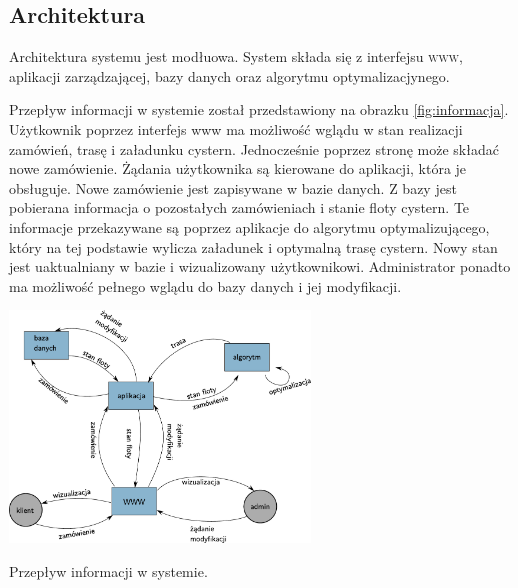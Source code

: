 \documentclass[11pt,a4paper,oneside]{mwart}
\begin{document}
\subsection{Architektura}
Architektura systemu jest modłuowa. System składa się z interfejsu \textsc{www}, aplikacji zarządzającej, bazy danych oraz algorytmu optymalizacjynego.

Przepływ informacji w systemie został przedstawiony na obrazku \ref{fig:informacja}. Użytkownik poprzez interfejs www ma możliwość wglądu w stan realizacji zamówień, trasę i załadunku cystern. Jednocześnie poprzez stronę może składać nowe zamówienie. Żądania użytkownika są kierowane do aplikacji, która je obsługuje. Nowe zamówienie jest zapisywane w bazie danych. Z bazy jest pobierana informacja o pozostałych zamówieniach i stanie floty cystern. Te informacje przekazywane są poprzez aplikacje do algorytmu optymalizującego, który na tej podstawie wylicza załadunek i optymalną trasę cystern.  Nowy stan jest uaktualniany w bazie i wizualizowany użytkownikowi.
Administrator ponadto ma możliwość pełnego wglądu do bazy danych i jej modyfikacji.

\begin{schemat}
  \centering
  \includegraphics[width=0.6\textwidth]{pics/przep_inf.pdf}
  \caption{Przepływ informacji w systemie.}
  \label{fig:informacja}
\end{schemat}

\end{document}
